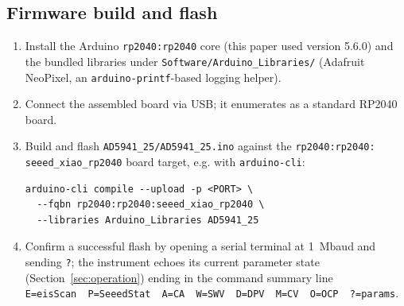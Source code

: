 \subsection{Firmware build and flash}
\begin{enumerate}
\item Install the Arduino \texttt{rp2040:rp2040} core (this paper used
  version 5.6.0) and the bundled libraries under
  \texttt{Software/Arduino\_Libraries/} (Adafruit NeoPixel, an
  \texttt{arduino-printf}-based logging helper).
\item Connect the assembled board via USB; it enumerates as a standard
  RP2040 board.
\item Build and flash \texttt{AD5941\_25/\allowbreak AD5941\_25.ino}
  against the \texttt{rp2040:\allowbreak rp2040:\allowbreak
  seeed\_xiao\_rp2040} board target, e.g. with \texttt{arduino-cli}:
\begin{verbatim}
arduino-cli compile --upload -p <PORT> \
  --fqbn rp2040:rp2040:seeed_xiao_rp2040 \
  --libraries Arduino_Libraries AD5941_25
\end{verbatim}
\item Confirm a successful flash by opening a serial terminal at
  \SI{1}{\mega baud} and sending \texttt{?}; the instrument echoes its
  current parameter state (Section~\ref{sec:operation}) ending in the
  command summary line
  \texttt{E=eisScan\ \ P=SeeedStat\ \ A=CA\ \ W=SWV\ \ D=DPV\ \ M=CV\ \ O=OCP\ \ ?=params}.
\end{enumerate}
